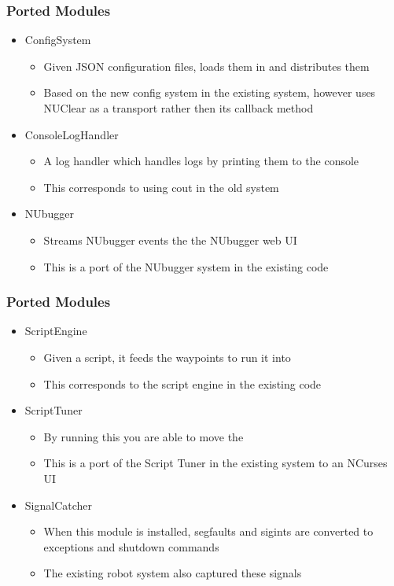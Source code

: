 \documentclass{beamer}
\begin{document}
\begin{frame}
	\frametitle{Ported Modules}
	\begin{itemize}
		\item ConfigSystem
			\begin{itemize}
				\item Given JSON configuration files, loads them in and distributes them
				\item Based on the new config system in the existing system, however uses NUClear as a transport rather then its callback method
			\end{itemize}
			
		\item ConsoleLogHandler
			\begin{itemize}
				\item A log handler which handles logs by printing them to the console
				\item This corresponds to using cout in the old system
			\end{itemize}
			
		\item NUbugger
			\begin{itemize}
				\item Streams NUbugger events the the NUbugger web UI
				\item This is a port of the NUbugger system in the existing code
			\end{itemize}
		\end{itemize}
\end{frame}

\begin{frame}
	\frametitle{Ported Modules}
	\begin{itemize}
		\item ScriptEngine
			\begin{itemize}
				\item Given a script, it feeds the waypoints to run it into 
				\item This corresponds to the script engine in the existing code
			\end{itemize}

		\item ScriptTuner
			\begin{itemize}
				\item By running this you are able to move the
				\item This is a port of the Script Tuner in the existing system to an NCurses UI
			\end{itemize}
			
		\item SignalCatcher
			\begin{itemize}
				\item When this module is installed, segfaults and sigints are converted to exceptions and shutdown commands
				\item The existing robot system also captured these signals
			\end{itemize}
	\end{itemize}
\end{frame}
			
\end{document}
